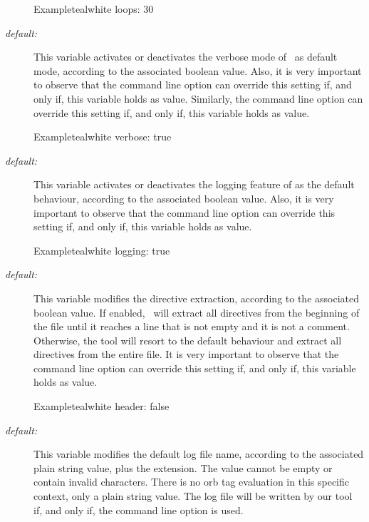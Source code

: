 \begin{description}
\begin{codebox}{Example}{teal}{\icnote}{white}
loops: 30
\end{codebox}

\item[\describecf{O}{boolean}{verbose}\hfill {\normalfont\itshape default:} \rbox{false}] This variable activates or deactivates the verbose mode of \arara\ as default mode, according to the associated boolean value. Also, it is very important to observe that the  command line option can override this setting if, and only if, this variable holds  as value. Similarly, the  command line option can override this setting if, and only if, this variable holds  as value.

\begin{codebox}{Example}{teal}{\icnote}{white}
verbose: true
\end{codebox}

\item[\describecf{O}{boolean}{logging}\hfill {\normalfont\itshape default:} \rbox{false}] This variable activates or deactivates the logging feature of \arara as the default behaviour, according to the associated boolean value. Also, it is very important to observe that the  command line option can override this setting if, and only if, this variable holds  as value.

\begin{codebox}{Example}{teal}{\icnote}{white}
logging: true
\end{codebox}

\item[\describecf{O}{boolean}{header}\hfill {\normalfont\itshape default:} \rbox{false}] This variable modifies the directive extraction, according to the associated boolean value. If enabled, \arara\ will extract all directives from the beginning of the file until it reaches a line that is not empty and it is not a comment. Otherwise, the tool will resort to the default behaviour and extract all directives from the entire file. It is very important to observe that the  command line option can override this setting if, and only if, this variable holds  as value.

\begin{codebox}{Example}{teal}{\icnote}{white}
header: false
\end{codebox}

\item[\describecf{O}{string}{logname}\hfill {\normalfont\itshape default:} \rbox{arara}] This variable modifies the default log file name, according to the associated plain string value, plus the  extension. The value cannot be empty or contain invalid characters. There is no orb tag evaluation in this specific context, only a plain string value. The log file will be written by our tool if, and only if, the  command line option is used.


\end{description}

